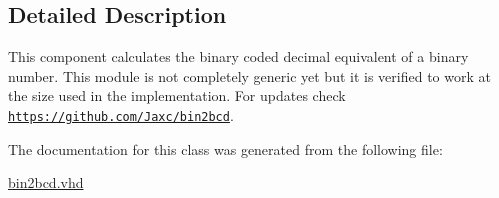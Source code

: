 \subsection{Detailed Description}
This component calculates the binary coded decimal equivalent of a binary number. This module is not completely generic yet but it is verified to work at the size used in the implementation. For updates check \href{https://github.com/Jaxc/bin2bcd}{\tt https\-://github.\-com/\-Jaxc/bin2bcd}. 

The documentation for this class was generated from the following file\-:\begin{DoxyCompactItemize}
\item 
\hyperlink{bin2bcd_8vhd}{bin2bcd.\-vhd}\end{DoxyCompactItemize}
